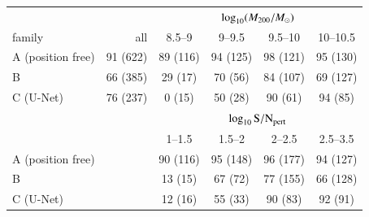 \begin{tabular}{lrcccc}
\toprule
 & & \multicolumn{4}{c}{$\log_{10}(M_{200}/M_\odot)$} \\
family & all & 8.5--9 & 9--9.5 & 9.5--10 & 10--10.5 \\
\midrule
A (position free) & 91 (622) & 89 (116) & 94 (125) & 98 (121) & 95 (130) \\
B & 66 (385) & 29 (17) & 70 (56) & 84 (107) & 69 (127) \\
C (U-Net) & 76 (237) & 0 (15) & 50 (28) & 90 (61) & 94 (85) \\
\midrule
 & & \multicolumn{4}{c}{$\log_{10}{\rm S/N}_{\rm pert}$} \\
 & & 1--1.5 & 1.5--2 & 2--2.5 & 2.5--3.5 \\
\midrule
A (position free) & & 90 (116) & 95 (148) & 96 (177) & 94 (127) \\
B & & 13 (15) & 67 (72) & 77 (155) & 66 (128) \\
C (U-Net) & & 12 (16) & 55 (33) & 90 (83) & 92 (91) \\
\bottomrule
\end{tabular}
